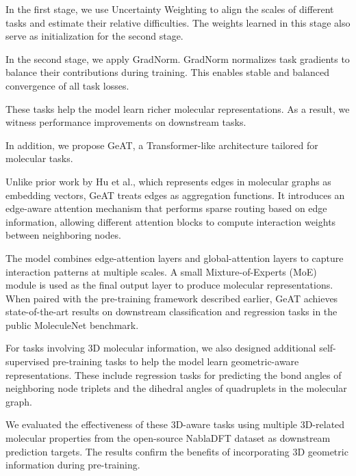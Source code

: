 \documentclass{article}
\theoremstyle{plain}
\theoremstyle{definition}
\theoremstyle{remark}
\begin{document}
In the first stage, we use Uncertainty Weighting to align the scales of different tasks and estimate their relative difficulties. The weights learned in this stage also serve as initialization for the second stage.

In the second stage, we apply GradNorm. GradNorm normalizes task gradients to balance their contributions during training. This enables stable and balanced convergence of all task losses.

These tasks help the model learn richer molecular representations.
As a result, we witness performance improvements on downstream tasks. 

In addition, we propose GeAT, a Transformer-like architecture tailored for molecular tasks. 

Unlike prior work by Hu et al., which represents edges in molecular graphs as embedding vectors, GeAT treats edges as aggregation functions. It introduces an edge-aware attention mechanism that performs sparse routing based on edge information, allowing different attention blocks to compute interaction weights between neighboring nodes. 

The model combines edge-attention layers and global-attention layers to capture interaction patterns at multiple scales. A small Mixture-of-Experts (MoE) module is used as the final output layer to produce molecular representations. When paired with the pre-training framework described earlier, GeAT achieves state-of-the-art results on downstream classification and regression tasks in the public MoleculeNet benchmark.

For tasks involving 3D molecular information, we also designed additional self-supervised pre-training tasks to help the model learn geometric-aware representations. These include regression tasks for predicting the bond angles of neighboring node triplets and the dihedral angles of quadruplets in the molecular graph.  

We evaluated the effectiveness of these 3D-aware tasks using multiple 3D-related molecular properties from the open-source NablaDFT dataset as downstream prediction targets. The results confirm the benefits of incorporating 3D geometric information during pre-training.
\end{document}
